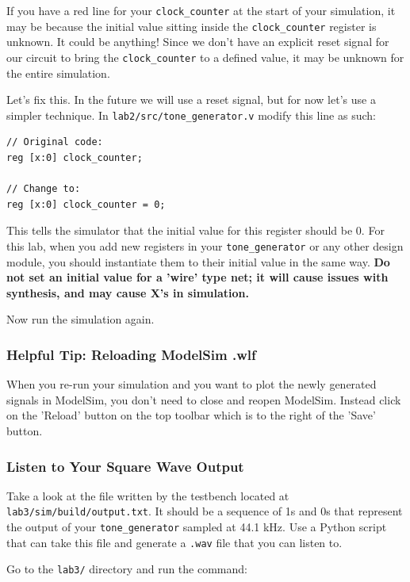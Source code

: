 \documentclass[11pt]{article}
\begin{document}
If you have a red line for your \verb|clock_counter| at the start of your simulation, it may be because the initial value sitting inside the \verb|clock_counter| register is unknown. It could be anything! Since we don't have an explicit reset signal for our circuit to bring the \verb|clock_counter| to a defined value, it may be unknown for the entire simulation.

Let's fix this. In the future we will use a reset signal, but for now let's use a simpler technique. In \verb|lab2/src/tone_generator.v| modify this line as such:

\begin{verbatim}
// Original code:
reg [x:0] clock_counter;

// Change to:
reg [x:0] clock_counter = 0;
\end{verbatim}

This tells the simulator that the initial value for this register should be 0. For this lab, when you add new registers in your \verb|tone_generator| or any other design module, you should instantiate them to their initial value in the same way. \textbf{Do not set an initial value for a 'wire' type net; it will cause issues with synthesis, and may cause X's in simulation.}

Now run the simulation again.

\subsubsection{Helpful Tip: Reloading ModelSim .wlf}

When you re-run your simulation and you want to plot the newly generated signals in ModelSim, you don't need to close and reopen ModelSim. Instead click on the 'Reload' button on the top toolbar which is to the right of the 'Save' button.

\subsubsection{Listen to Your Square Wave Output}

Take a look at the file written by the testbench located at \verb|lab3/sim/build/output.txt|. It should be a sequence of 1s and 0s that represent the output of your \verb|tone_generator| sampled at 44.1 kHz. Use a Python script that can take this file and generate a \verb|.wav| file that you can listen to.

Go to the \verb|lab3/| directory and run the command:
\end{document}
